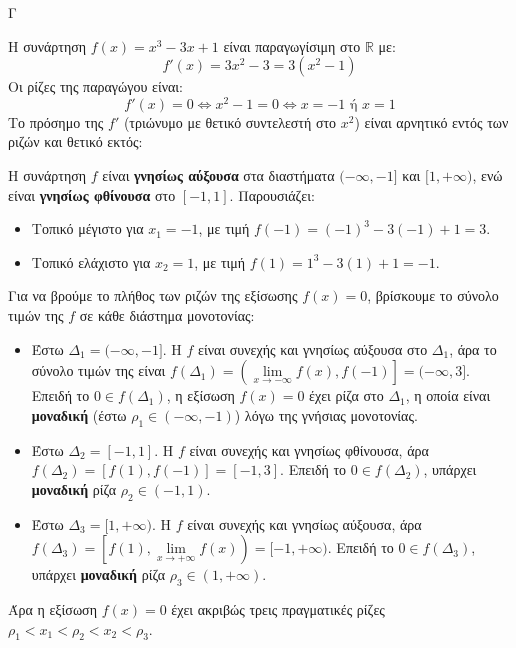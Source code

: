 \begin{thema}{Γ}
\begin{erwthma}
  \item 
  Η συνάρτηση $f(x) = x^3 - 3x + 1$ είναι παραγωγίσιμη στο $\mathbb{R}$ με:
  \[ f'(x) = 3x^2 - 3 = 3(x^2 - 1) \]
  Οι ρίζες της παραγώγου είναι:
  \[ f'(x) = 0 \Leftrightarrow x^2 - 1 = 0 \Leftrightarrow x = -1 \text{ ή } x = 1 \]
  Το πρόσημο της $f'$ (τριώνυμο με θετικό συντελεστή στο $x^2$) είναι αρνητικό εντός των ριζών και θετικό εκτός:
  \begin{center}
  \end{center}
  Η συνάρτηση $f$ είναι \textbf{γνησίως αύξουσα} στα διαστήματα $(-\infty, -1]$ και $[1, +\infty)$, ενώ είναι \textbf{γνησίως φθίνουσα} στο $[-1, 1]$.
  Παρουσιάζει:
  \begin{itemize}
    \item Τοπικό μέγιστο για $x_1 = -1$, με τιμή $f(-1) = (-1)^3 - 3(-1) + 1 = 3$.
    \item Τοπικό ελάχιστο για $x_2 = 1$, με τιμή $f(1) = 1^3 - 3(1) + 1 = -1$.
  \end{itemize}

  \item 
  Για να βρούμε το πλήθος των ριζών της εξίσωσης $f(x) = 0$, βρίσκουμε το σύνολο τιμών της $f$ σε κάθε διάστημα μονοτονίας:
  \begin{itemize}
    \item Έστω $\Delta_1 = (-\infty, -1]$. Η $f$ είναι συνεχής και γνησίως αύξουσα στο $\Delta_1$, άρα το σύνολο τιμών της είναι $f(\Delta_1) = \left( \lim\limits_{x \to -\infty} f(x), f(-1) \right] = (-\infty, 3]$. 
    Επειδή το $0 \in f(\Delta_1)$, η εξίσωση $f(x)=0$ έχει ρίζα στο $\Delta_1$, η οποία είναι \textbf{μοναδική} (έστω $\rho_1 \in (-\infty, -1)$) λόγω της γνήσιας μονοτονίας.
    \item Έστω $\Delta_2 = [-1, 1]$. Η $f$ είναι συνεχής και γνησίως φθίνουσα, άρα $f(\Delta_2) = \left[ f(1), f(-1) \right] = [-1, 3]$.
    Επειδή το $0 \in f(\Delta_2)$, υπάρχει \textbf{μοναδική} ρίζα $\rho_2 \in (-1, 1)$.
    \item Έστω $\Delta_3 = [1, +\infty)$. Η $f$ είναι συνεχής και γνησίως αύξουσα, άρα $f(\Delta_3) = \left[ f(1), \lim\limits_{x \to +\infty} f(x) \right) = [-1, +\infty)$.
    Επειδή το $0 \in f(\Delta_3)$, υπάρχει \textbf{μοναδική} ρίζα $\rho_3 \in (1, +\infty)$.
  \end{itemize}
  Άρα η εξίσωση $f(x) = 0$ έχει ακριβώς τρεις πραγματικές ρίζες $\rho_1 < x_1 < \rho_2 < x_2 < \rho_3$.


\end{erwthma}
\end{thema}
